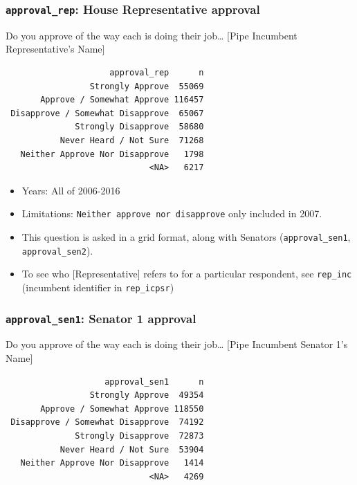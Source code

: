 \documentclass[10pt,article,oneside]{memoir}
\theoremstyle{definition}
\begin{document}
\subsubsection{\texorpdfstring{\texttt{approval\_rep}: House
Representative
approval}{approval\_rep: House Representative approval}}\label{approval_rep-house-representative-approval}

Do you approve of the way each is doing their job\ldots{} {[}Pipe
Incumbent Representative's Name{]}

\begin{verbatim}
                     approval_rep      n
                 Strongly Approve  55069
       Approve / Somewhat Approve 116457
 Disapprove / Somewhat Disapprove  65067
              Strongly Disapprove  58680
           Never Heard / Not Sure  71268
   Neither Approve Nor Disapprove   1798
                             <NA>   6217
\end{verbatim}

\begin{itemize}
\tightlist
\item
  Years: All of 2006-2016
\item
  Limitations: \texttt{Neither\ approve\ nor\ disapprove} only included
  in 2007.
\item
  This question is asked in a grid format, along with Senators
  (\texttt{approval\_sen1}, \texttt{approval\_sen2}).
\item
  To see who {[}Representative{]} refers to for a particular respondent,
  see \texttt{rep\_inc} (incumbent identifier in \texttt{rep\_icpsr})
\end{itemize}

\subsubsection{\texorpdfstring{\texttt{approval\_sen1}: Senator 1
approval}{approval\_sen1: Senator 1 approval}}\label{approval_sen1-senator-1-approval}

Do you approve of the way each is doing their job\ldots{} {[}Pipe
Incumbent Senator 1's Name{]}

\begin{verbatim}
                    approval_sen1      n
                 Strongly Approve  49354
       Approve / Somewhat Approve 118550
 Disapprove / Somewhat Disapprove  74192
              Strongly Disapprove  72873
           Never Heard / Not Sure  53904
   Neither Approve Nor Disapprove   1414
                             <NA>   4269
\end{verbatim}
\end{document}
